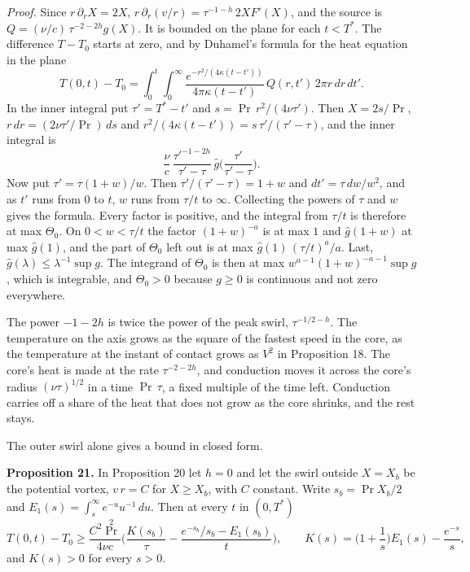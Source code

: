 \emph{Proof.} Since $r\,\partial_r X = 2X$, $r\,\partial_r(v/r) = \tau^{-1-h}\,2XF'(X)$, and the
source is $Q = (\nu/c)\,\tau^{-2-2h}g(X)$. It is bounded on the plane for each $t < T^*$. The
difference $T - T_0$ starts at zero, and by Duhamel's formula for the heat equation in the plane
\[
T(0,t) - T_0 = \int_0^t \int_0^\infty \frac{e^{-r^2/(4\kappa(t-t'))}}{4\pi\kappa(t-t')}\,
Q(r,t')\,2\pi r\,dr\,dt' .
\]
In the inner integral put $\tau' = T^* - t'$ and $s = \Pr\,r^2/(4\nu\tau')$. Then $X = 2s/\Pr$,
$r\,dr = (2\nu\tau'/\Pr)\,ds$ and $r^2/(4\kappa(t-t')) = s\,\tau'/(\tau'-\tau)$, and the inner
integral is
\[
\frac{\nu}{c}\,\frac{\tau'^{-1-2h}}{\tau'-\tau}\,\hat g\Big(\frac{\tau'}{\tau'-\tau}\Big) .
\]
Now put $\tau' = \tau(1+w)/w$. Then $\tau'/(\tau'-\tau) = 1 + w$ and $dt' = \tau\,dw/w^2$, and as
$t'$ runs from $0$ to $t$, $w$ runs from $\tau/t$ to $\infty$. Collecting the powers of $\tau$
and $w$ gives the formula. Every factor is positive, and the integral from $\tau/t$ is therefore
at max $\Theta_0$. On $0 < w < \tau/t$ the factor $(1+w)^{-a}$ is at max $1$ and
$\hat g(1+w)$ at max $\hat g(1)$, and the part of $\Theta_0$ left out is at max
$\hat g(1)\,(\tau/t)^a/a$. Last, $\hat g(\lambda) \le \lambda^{-1}\sup g$. The integrand of
$\Theta_0$ is then at max $w^{a-1}(1+w)^{-a-1}\sup g$, which is integrable, and $\Theta_0 > 0$
because $g \ge 0$ is
continuous and not zero everywhere. \hfill\qedsymbol

The power $-1-2h$ is twice the power of the peak swirl, $\tau^{-1/2-h}$. The temperature on the
axis grows as the square of the fastest speed in the core, as the temperature at the instant of
contact grows as $V^2$ in Proposition 18. The core's heat is made at the rate $\tau^{-2-2h}$, and
conduction moves it across the core's radius $(\nu\tau)^{1/2}$ in a time $\Pr\,\tau$, a fixed
multiple of the time left. Conduction carries off a share of the heat that does not grow as the
core shrinks, and the rest stays.

The outer swirl alone gives a bound in closed form.

\textbf{Proposition 21.} In Proposition 20 let $h = 0$ and let the swirl outside $X = X_b$ be the
potential vortex, $v\,r = C$ for $X \ge X_b$, with $C$ constant. Write $s_b = \Pr X_b/2$ and
$E_1(s) = \int_s^\infty e^{-u}u^{-1}\,du$. Then at every $t$ in $(0,T^*)$
\[
T(0,t) - T_0 \ge \frac{C^2\Pr^2}{4\nu c}\Big(\frac{K(s_b)}{\tau}
- \frac{e^{-s_b}/s_b - E_1(s_b)}{t}\Big), \qquad
K(s) = \Big(1 + \frac{1}{s}\Big)E_1(s) - \frac{e^{-s}}{s} ,
\]
and $K(s) > 0$ for every $s > 0$.

